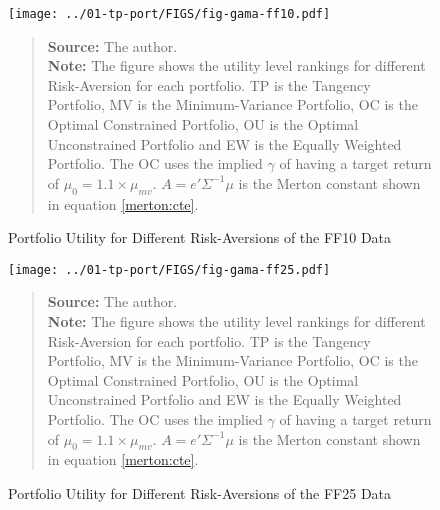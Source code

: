 \documentclass[12pt,oneside,a4paper]{memoir}
\begin{document}

\begin{figure}[ht!]
\centering
\footnotesize
\caption{Portfolio Utility for Different Risk-Aversions of the FF10 Data}\label{fig:gama:ff10} %
\vspace{-1 em}
\texttt{[image: ../01-tp-port/FIGS/fig-gama-ff10.pdf]}
\vspace{-2 em}
\begin{quote}
\textbf{Source:} The author. \\
\textbf{Note:}
The figure shows the utility level rankings for different Risk-Aversion for each portfolio.
TP is the Tangency Portfolio, MV is the Minimum-Variance Portfolio, OC is the Optimal Constrained Portfolio, OU is the Optimal Unconstrained Portfolio and EW is the Equally Weighted Portfolio.
The OC uses the implied $\gamma$ of having a target return of $\mu_{0}=1.1\times\mu_{mv}$.
$A=e'\Sigma^{-1}\mu$ is the Merton constant shown in equation \eqref{merton:cte}. 
\end{quote}
\end{figure}

\begin{figure}[!ht]
\centering
\footnotesize
\caption{Portfolio Utility for Different Risk-Aversions of the FF25 Data}\label{fig:gama:ff25} %
\vspace{-1 em}
\texttt{[image: ../01-tp-port/FIGS/fig-gama-ff25.pdf]}
\vspace{-2 em}
\begin{quote}
\textbf{Source:} The author. \\
\textbf{Note:}
The figure shows the utility level rankings for different Risk-Aversion for each portfolio.
TP is the Tangency Portfolio, MV is the Minimum-Variance Portfolio, OC is the Optimal Constrained Portfolio, OU is the Optimal Unconstrained Portfolio and EW is the Equally Weighted Portfolio.
The OC uses the implied $\gamma$ of having a target return of $\mu_{0}=1.1\times\mu_{mv}$.
$A=e'\Sigma^{-1}\mu$ is the Merton constant shown in equation \eqref{merton:cte}.
\end{quote}
\end{figure}


\end{document}
